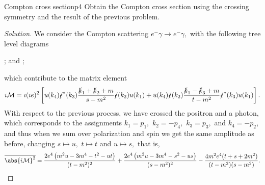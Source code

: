 \begin{problem}{Compton cross section}{p4}
   Obtain the Compton cross section using the crossing symmetry and the result of the previous problem.
\end{problem}
\begin{proof}[Solution]
   We consider the Compton scattering \(e^- \gamma \to e^- \gamma,\) with the following tree level diagrams
   \begin{center}
      ;
      and
      ;
   \end{center}
   which contribute to the matrix element
   \begin{equation*}
      i\mathcal{M} = i(ie)^2 \left[\bar{u}(k_4) \slashed{\epsilon}^*(k_3) \frac{\slashed{k}_1 + \slashed{k}_2 + m}{s - m^2} \slashed{\epsilon}(k_2) u(k_1) + \bar{u}(k_4) \slashed{\epsilon}(k_2) \frac{\slashed{k}_1 - \slashed{k}_3 + m}{t - m^2} \slashed{\epsilon}^*(k_3) u(k_1)\right].
   \end{equation*}
   With respect to the previous process, we have crossed the positron and a photon, which corresponds to the assignments \(k_1 = p_1,\) \(k_2 = -p_4,\) \(k_3 = p_3,\) and \(k_4 = -p_2\), and thus when we sum over polarization and spin we get the same amplitude as before, changing \(s \mapsto u,\) \(t\mapsto t\) and \(u \mapsto s,\) that is,
   \begin{equation*}
      \overline{\abs{i\mathcal{M}}^2} = \frac{2e^4\left(m^2u-3m^4 - t^2 - ut\right)}{(t - m^2)^2} + \frac{2e^4\left(m^2u-3m^4 - s^2 - us\right)}{(s - m^2)^2}- \frac{4m^2 e^4(t + s + 2m^2)}{(t - m^2)(s - m^2)}.
   \end{equation*}


\end{proof}

